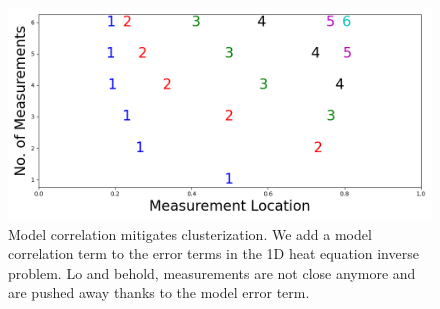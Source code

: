 \begin{figure}
    \centering
    \includegraphics[height=0.5\textwidth]{figs/dst_modelError4.png}
    \caption{Model correlation mitigates clusterization. We add a
      model correlation term to the error terms in the 1D heat
      equation inverse problem. Lo and behold, measurements are not
      close anymore and are pushed away thanks to the model error
      term.}
  \label{fig:corr_errors}
\end{figure}


